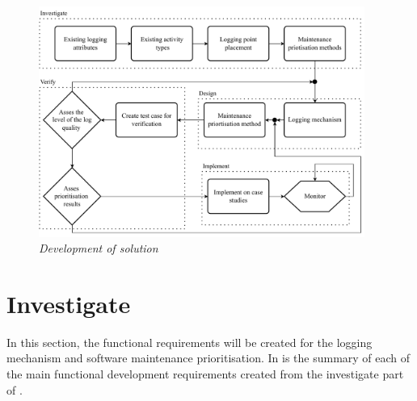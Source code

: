 \begin{figure}[!htb]
	\centering %
	\includegraphics[width=0.95\textwidth]{img/Chapter2/developmentOfSolution/developementOfSolution.pdf}
	\caption[Development of solution]
	{\textit{Development of solution}}\label{fig:ch2_developmentOfSolution}
\end{figure}

\clearpage

\section{Investigate}
In this section, the functional requirements will be created for the logging mechanism and software maintenance prioritisation. In  is the summary of each of the main functional development requirements created from the investigate part of .

